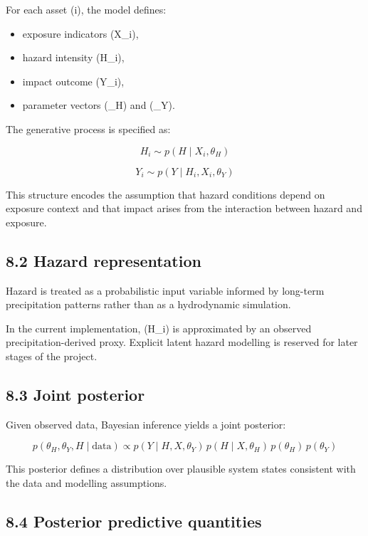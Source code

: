 \documentclass[
]{article}
\providecommand{\tightlist}{%
  \setlength{\itemsep}{0pt}\setlength{\parskip}{0pt}}
\begin{document}
For each asset (i), the model defines:

\begin{itemize}
\tightlist
\item
  exposure indicators (X\_i),
\item
  hazard intensity (H\_i),
\item
  impact outcome (Y\_i),
\item
  parameter vectors (\theta\_H) and (\theta\_Y).
\end{itemize}

The generative process is specified as:

\[
H_i \sim p(H \mid X_i, \theta_H)
\]

\[
Y_i \sim p(Y \mid H_i, X_i, \theta_Y)
\]

This structure encodes the assumption that hazard conditions depend on
exposure context and that impact arises from the interaction between
hazard and exposure.

\subsection{8.2 Hazard representation}\label{hazard-representation}

Hazard is treated as a probabilistic input variable informed by
long-term precipitation patterns rather than as a hydrodynamic
simulation.

In the current implementation, (H\_i) is approximated by an observed
precipitation-derived proxy. Explicit latent hazard modelling is
reserved for later stages of the project.

\subsection{8.3 Joint posterior}\label{joint-posterior}

Given observed data, Bayesian inference yields a joint posterior:

\[
p(\theta_H, \theta_Y, H \mid \text{data})
\propto
p(Y \mid H, X, \theta_Y)\, p(H \mid X, \theta_H)\, p(\theta_H)\, p(\theta_Y)
\]

This posterior defines a distribution over plausible system states
consistent with the data and modelling assumptions.

\subsection{8.4 Posterior predictive
quantities}\label{posterior-predictive-quantities}
\end{document}
